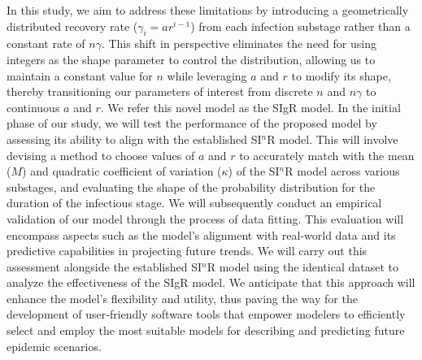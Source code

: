 \documentclass[12pt]{article}
\begin{document}
In this study, we aim to address these limitations by introducing a geometrically distributed recovery rate ($\gamma_i = ar^{i-1}$) from each infection substage rather than a constant rate of $n\gamma$.
This shift in perspective eliminates the need for using integers as the shape parameter to control the distribution, allowing us to maintain a constant value for $n$ while leveraging $a$ and $r$ to modify its shape, thereby transitioning our parameters of interest from discrete $n$ and $n\gamma$ to continuous $a$ and $r$.
We refer this novel model as the SIgR model. In the initial phase of our study, we will test the performance of the proposed model by assessing its ability to align with the established SI$^n$R model.
This will involve devising a method to choose values of $a$ and $r$ to accurately match with the mean ($M$) and quadratic coefficient of variation ($\kappa$) of the SI$^n$R model across various substages, and evaluating the shape of the probability distribution for the duration of the infectious stage. We will subsequently conduct an empirical validation of our model through the process of data fitting. This evaluation will encompass aspects such as the model's alignment with real-world data and its predictive capabilities in projecting future trends. We will carry out this assessment alongside the established SI$^n$R model using the identical dataset to analyze the effectiveness of the SIgR model. We anticipate that this approach will enhance the model's flexibility and utility, thus paving the way for the development of user-friendly software tools that empower modelers to efficiently select and employ the most suitable models for describing and predicting future epidemic scenarios.
\end{document}
